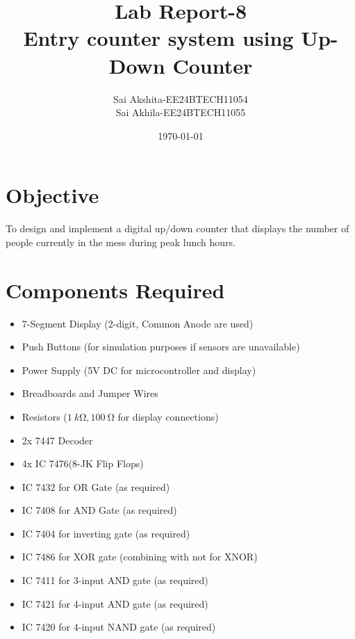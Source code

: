 \documentclass[a4paper,12pt]{article}
\begin{document}
\title{\textbf{Lab Report-8}\\Entry counter system using Up-Down Counter}
\author{Sai Akshita-EE24BTECH11054\\Sai Akhila-EE24BTECH11055}
\date{\today}
\maketitle

{\hypersetup{linkcolor=blue}
\tableofcontents}

\newpage

\section{Objective}
To design and implement a digital up/down counter that displays the number of people currently
in the mess during peak lunch hours.

\section{Components Required}
\begin{itemize}
    \item 7-Segment Display (2-digit, Common Anode are used)
    \item Push Buttons (for simulation purposes if sensors are unavailable)
    \item Power Supply (5V DC for microcontroller and display)
    \item Breadboards and Jumper Wires
    \item Resistors ($\SI{1}{k\ohm}, \SI{100}{\ohm}$ for display connections)
    \item 2x 7447 Decoder
    \item 4x IC 7476(8-JK Flip Flops)
    \item IC 7432 for OR Gate (as required)
    \item IC 7408 for AND Gate (as required)
    \item IC 7404 for inverting gate (as required)
    \item IC 7486 for XOR gate (combining with not for XNOR)
    \item IC 7411 for 3-input AND gate (as required)
    \item IC 7421 for 4-input AND gate (as required)
    \item IC 7420 for 4-input NAND gate (as required)
\end{itemize}
\end{document}
